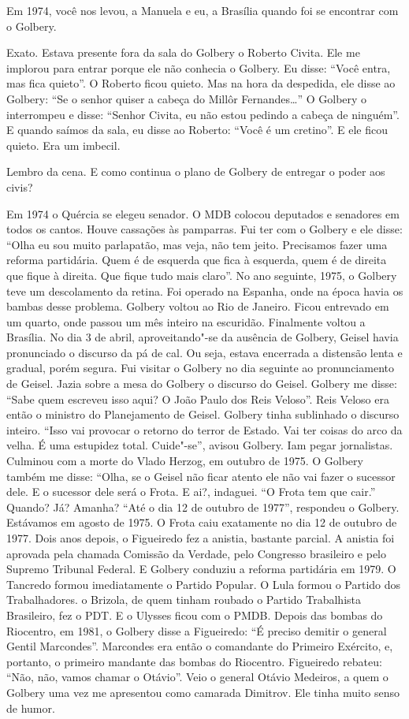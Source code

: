 \falaG Em 1974, você nos levou, a Manuela e eu, a Brasília quando foi se
encontrar com o Golbery.

\falaM Exato. Estava presente fora da sala do Golbery o Roberto Civita. Ele
me implorou para entrar porque ele não conhecia o Golbery. Eu disse:
``Você entra, mas fica quieto''. O Roberto ficou quieto. Mas na hora da
despedida, ele disse ao Golbery: ``Se o senhor quiser a cabeça do Millôr
Fernandes…'' O Golbery o interrompeu e disse: ``Senhor Civita, eu não
estou pedindo a cabeça de ninguém''. E quando saímos da sala, eu disse
ao Roberto: ``Você é um cretino''. E ele ficou quieto. Era um imbecil.

\falaG Lembro da cena. E como continua o plano de Golbery de entregar o
poder aos civis?

\falaM Em 1974 o Quércia se elegeu senador. O MDB colocou deputados e
senadores em todos os cantos. Houve cassações às pamparras. Fui ter com
o Golbery e ele disse: ``Olha eu sou muito parlapatão, mas veja, não tem
jeito. Precisamos fazer uma reforma partidária. Quem é de esquerda que
fica à esquerda, quem é de direita que fique à direita. Que fique tudo
mais claro''. No ano seguinte, 1975, o Golbery teve um descolamento da
retina. Foi operado na Espanha, onde na época havia os bambas desse
problema. Golbery voltou ao Rio de Janeiro. Ficou entrevado em um
quarto, onde passou um mês inteiro na escuridão. Finalmente voltou a
Brasília. No dia 3 de abril, aproveitando"-se da ausência de Golbery,
Geisel havia pronunciado o discurso da pá de cal. Ou seja, estava
encerrada a distensão lenta e gradual, porém segura. Fui visitar o
Golbery no dia seguinte ao pronunciamento de Geisel. Jazia sobre a mesa
do Golbery o discurso do Geisel. Golbery me disse: ``Sabe quem escreveu
isso aqui? O João Paulo dos Reis Veloso''. Reis Veloso era então o
ministro do Planejamento de Geisel. Golbery tinha sublinhado o discurso
inteiro. ``Isso vai provocar o retorno do terror de Estado. Vai ter
coisas do arco da velha. É uma estupidez total. Cuide"-se'', avisou
Golbery. Iam pegar jornalistas. Culminou com a morte do Vlado Herzog, em
outubro de 1975. O Golbery também me disse: ``Olha, se o Geisel não
ficar atento ele não vai fazer o sucessor dele. E o sucessor dele será o
Frota. E ai?, indaguei. ``O Frota tem que cair.'' Quando? Já? Amanha?
``Até o dia 12 de outubro de 1977'', respondeu o Golbery. Estávamos em
agosto de 1975. O Frota caiu exatamente no dia 12 de outubro de 1977.
Dois anos depois, o Figueiredo fez a anistia, bastante parcial. A
anistia foi aprovada pela chamada Comissão da Verdade, pelo Congresso
brasileiro e pelo Supremo Tribunal Federal. E Golbery conduziu a reforma
partidária em 1979. O Tancredo formou imediatamente o Partido Popular. O
Lula formou o Partido dos Trabalhadores. o Brizola, de quem tinham
roubado o Partido Trabalhista Brasileiro, fez o PDT. E o Ulysses ficou
com o PMDB. Depois das bombas do Riocentro, em 1981, o Golbery disse a
Figueiredo: ``É preciso demitir o general Gentil Marcondes''. Marcondes
era então o comandante do Primeiro Exército, e, portanto, o primeiro
mandante das bombas do Riocentro. Figueiredo rebateu: ``Não, não, vamos
chamar o Otávio''. Veio o general Otávio Medeiros, a quem o Golbery uma
vez me apresentou como camarada Dimitrov. Ele tinha muito senso de
humor.

